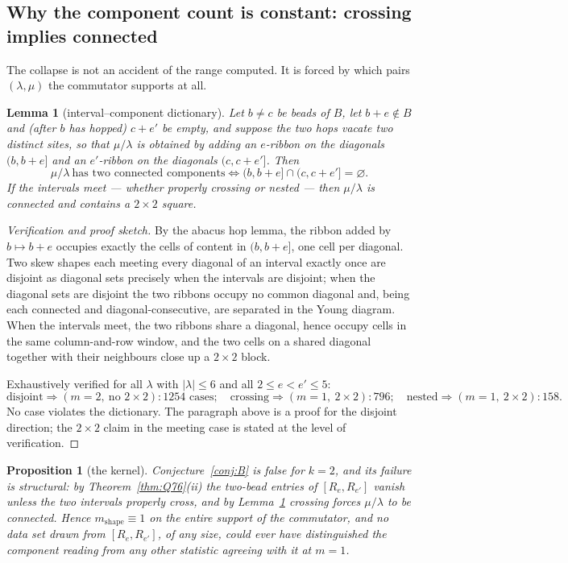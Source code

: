 \documentclass[11pt]{article}
\newtheorem{proposition}[theorem]{Proposition}
\newtheorem{lemma}[theorem]{Lemma}
\theoremstyle{definition}
\begin{document}
\subsection{Why the component count is constant: crossing implies connected}

The collapse is not an accident of the range computed. It is forced by which pairs
$(\lambda,\mu)$ the commutator supports at all.

\begin{lemma}[interval--component dictionary]\label{lem:cross}
Let $b\ne c$ be beads of $B$, let $b+e\notin B$ and (after $b$ has hopped) $c+e'$ be empty, and
suppose the two hops vacate two distinct sites, so that $\mu/\lambda$ is obtained by adding an
$e$-ribbon on the diagonals $(b,b+e]$ and an $e'$-ribbon on the diagonals $(c,c+e']$. Then
\[
\mu/\lambda\ \text{has two connected components}
\iff
(b,b+e]\cap(c,c+e']=\varnothing .
\]
If the intervals meet --- whether properly crossing or nested --- then $\mu/\lambda$ is connected
and contains a $2\times2$ square.
\end{lemma}

\begin{proof}[Verification and proof sketch]
By the abacus hop lemma, the ribbon added by $b\mapsto b+e$ occupies exactly the cells of content
in $(b,b+e]$, one cell per diagonal. Two skew shapes each meeting every diagonal of an interval
exactly once are disjoint as diagonal sets precisely when the intervals are disjoint; when the
diagonal sets are disjoint the two ribbons occupy no common diagonal and, being each connected and
diagonal-consecutive, are separated in the Young diagram. When the intervals meet, the two ribbons
share a diagonal, hence occupy cells in the same column-and-row window, and the two cells on a
shared diagonal together with their neighbours close up a $2\times2$ block.

Exhaustively verified for all $\lambda$ with $|\lambda|\le6$ and all $2\le e<e'\le5$:
\[
\text{disjoint}\Rightarrow(m=2,\ \text{no }2\times2)\colon 1254 \text{ cases};\quad
\text{crossing}\Rightarrow(m=1,\ 2\times2)\colon 796;\quad
\text{nested}\Rightarrow(m=1,\ 2\times2)\colon 158 .
\]
No case violates the dictionary. The paragraph above is a proof for the disjoint direction; the
$2\times2$ claim in the meeting case is stated at the level of verification.
\end{proof}

\begin{proposition}[the kernel]\label{prop:kernel}
Conjecture~\ref{conj:B} is false for $k=2$, and its failure is structural: by
Theorem~\ref{thm:Q76}(ii) the two-bead entries of $[R_e,R_{e'}]$ vanish unless the two intervals
properly cross, and by Lemma~\ref{lem:cross} crossing forces $\mu/\lambda$ to be connected.
Hence $m_{\mathrm{shape}}\equiv1$ on the entire support of the commutator, and no data set drawn
from $[R_e,R_{e'}]$, of any size, could ever have distinguished the component reading from any
other statistic agreeing with it at $m=1$.
\end{proposition}
\end{document}
